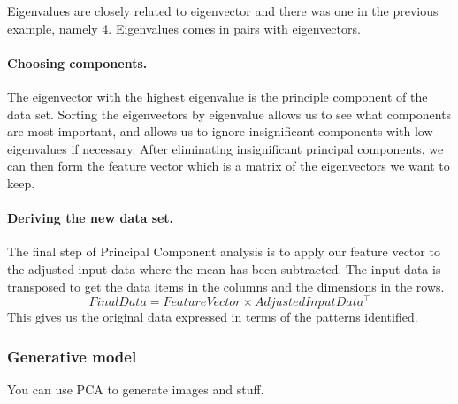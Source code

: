 Eigenvalues are closely related to eigenvector and there was one in the previous example, namely 4.
Eigenvalues comes in pairs with eigenvectors.

\paragraph{Choosing components.}
The eigenvector with the highest eigenvalue is the principle component of the data set.
Sorting the eigenvectors by eigenvalue allows us to see what components are most important, and allows us to ignore insignificant components with low eigenvalues if necessary.
After eliminating insignificant principal components, we can then form the feature vector which is a matrix of the eigenvectors we want to keep.


\paragraph{Deriving the new data set.}
The final step of Principal Component analysis is to apply our feature vector to the adjusted input data where the mean has been subtracted.
The input data is transposed to get the data items in the columns and the dimensions in the rows.
$$FinalData = FeatureVector\times AdjustedInputData^\top $$ %
This gives us the original data expressed in terms of the patterns identified.


\subsubsection{Generative model}
You can use PCA to generate images and stuff.
